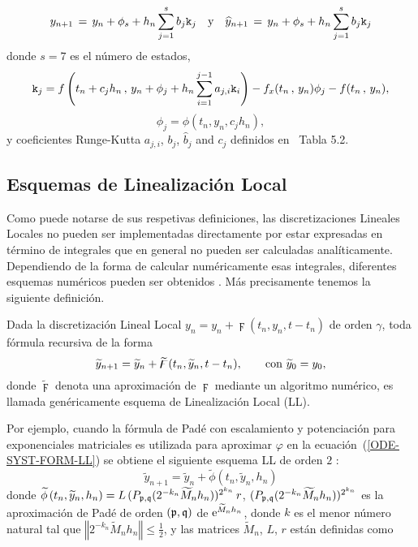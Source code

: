 \begin{equation}
y_{n+1}\,=\,y_n+\phi_s+h_n \sum_{j=1}^{s}b_j \mathtt{k}_j \quad \text{y} \quad
\widehat{y}_{n+1}\,=\, y_n+\phi_s+h_n \sum_{j=1}^{s}b_j \mathtt{k}_j
\label{LLDP scheme}
\end{equation}
donde $s = 7$ es el número de estados,
\[ \mathtt{k}_j = f\left( t_n+c_jh_n\, , \, y_n+\phi_j+h_n \sum_{i=1}^{j-1}a_{j,i}\mathtt{k}_i \right)  
- f_x(t_n\, , \, y_n)\phi_j - f(t_n\, ,\, y_n),\]
\[ \phi _j = \phi \left( t_{n},y_{n},c_jh_{n}\right), \]
y coeficientes Runge-Kutta $a_{j,i}$, $b_j$, $\hat{b}_j$ and $c_j$ definidos en~\cite{hairer1993solving} Tabla 5.2.

\subsection{Esquemas de Linealización Local}

Como puede notarse de sus respetivas definiciones, las
discretizaciones Lineales Locales no pueden ser implementadas directamente por
estar expresadas en término de integrales que en general no pueden ser
calculadas analíticamente. Dependiendo de la forma de calcular  numéricamente esas integrales,
 diferentes esquemas numéricos pueden ser obtenidos \cite{Jimenez05AMC,Jimenez13}.
 Más precisamente tenemos la siguiente definición.
\begin{definition}
	\label{definition LLS} Dada la discretización Lineal Local 
	  $y_n=y_{n}+\digamma(t_{n},y_{n},t-t_{n})$
	 de orden $\gamma $, toda fórmula recursiva de la forma 
	\begin{equation*}
	 \widetilde{y}_{n+1}=\widetilde{y}_{n}+\widetilde{\digamma}(t_{n},\widetilde{y}_{n},t-t_{n})
	 , \text{ \ \ \ \
		\ con }\widetilde{y}_{0}=y_{0},
	\end{equation*}%
	donde $\widetilde{\digamma}$ denota una aproximación
	de $\digamma$ mediante un algoritmo numérico, es
	llamada genéricamente esquema de Linealización Local (LL).
\end{definition}

Por ejemplo, cuando la fórmula de Padé con escalamiento y potenciación para exponenciales matriciales \cite{moler2003nineteen} es utilizada para
aproximar $\varphi$ en la ecuación~(\ref{ODE-SYST-FORM-LL}) se obtiene el siguiente esquema LL de orden $2$ \cite{Jimenez02AMC}:
\begin{equation} 
\widetilde{y}_{n+1}=\widetilde{y}_{n}+\widetilde{\phi}\left( t_{n},\widetilde{y}_{n},h_{n}\right) \label{LL-scheme}
\end{equation} 
donde $\widetilde{\phi }\left( t_{n},\widetilde{y}
_{n},h_{n}\right) =L\,(P_{\mathfrak{p},\mathfrak{q}}(2^{-k_{n}}\widetilde{M}_{n}h_{n}))^{2^{k_{n}}}\,r$, 
$(P_{\mathfrak{p},\mathfrak{q}}(2^{-k_{n}}\widetilde{M}_{n}h_{n}))^{2^{k_{n}}}$ es la aproximación
de Padé de orden $(\mathfrak{p},\mathfrak{q})$ de  $\mathrm{e}^{\widetilde{M}_{n}h_{n}}$, donde
$k$ es el menor número natural tal que $\left\Vert 2^{-k_{n}}\widetilde{M}_{n}h_{n}\right\Vert \leq \frac{1}{2}$, 
y las matrices $\widetilde{M}_{n}$, $L$, $r$ están definidas como

